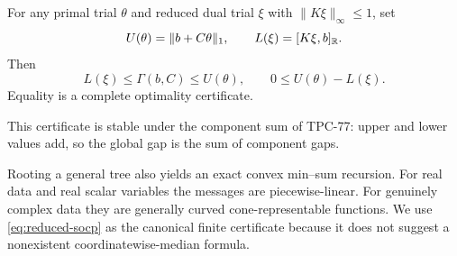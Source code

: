 \begin{proposition}\label{prop:reduced-gap}
For any primal trial \(\theta\) and reduced dual trial \(\xi\) with
\(\|K\xi\|_\infty\le1\), set
\[
 U(\theta)=\|b+C\theta\|_1,
 \qquad
 L(\xi)=[K\xi,b]_{\mathbb R}.
\]
Then
\[
 L(\xi)\le\Gamma(b,C)\le U(\theta),
 \qquad
 0\le U(\theta)-L(\xi).
\]
Equality is a complete optimality certificate.
\end{proposition}

This certificate is stable under the component sum of TPC-77: upper
and lower values add, so the global gap is the sum of component gaps.

\begin{remark}
Rooting a general tree also yields an exact convex min--sum recursion.
For real data and real scalar variables the messages are
piecewise-linear.  For genuinely complex data they are generally
curved cone-representable functions.  We use
\eqref{eq:reduced-socp} as the canonical finite certificate because it
does not suggest a nonexistent coordinatewise-median formula.
\end{remark}

